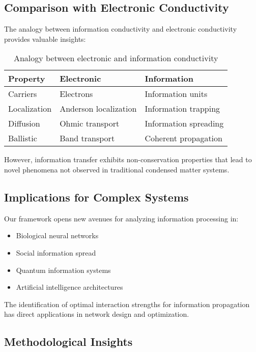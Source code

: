 \documentclass[twocolumn,showpacs,preprintnumbers,amsmath,amssymb,prb]{revtex4-2}
\begin{document}
\subsection{Comparison with Electronic Conductivity}
\label{sec:electronic_analogy}

The analogy between information conductivity and electronic conductivity provides valuable insights:

\begin{table}[h]
\centering
\begin{tabular}{|l|l|l|}
\hline
Property & Electronic & Information \\
\hline
Carriers & Electrons & Information units \\
Localization & Anderson localization & Information trapping \\
Diffusion & Ohmic transport & Information spreading \\
Ballistic & Band transport & Coherent propagation \\
\hline
\end{tabular}
\caption{Analogy between electronic and information conductivity}
\label{tab:analogy}
\end{table}

However, information transfer exhibits non-conservation properties that lead to novel phenomena not observed in traditional condensed matter systems.

\subsection{Implications for Complex Systems}
\label{sec:implications}

Our framework opens new avenues for analyzing information processing in:
\begin{itemize}
\item Biological neural networks
\item Social information spread
\item Quantum information systems
\item Artificial intelligence architectures
\end{itemize}

The identification of optimal interaction strengths for information propagation has direct applications in network design and optimization.

\subsection{Methodological Insights}
\label{sec:methodology}
\end{document}
